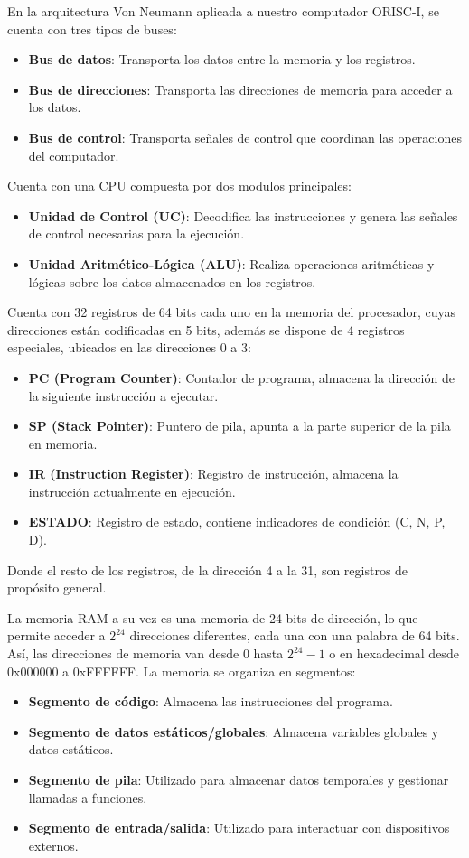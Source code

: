 \documentclass{article}
\begin{document}
En la arquitectura Von Neumann aplicada a nuestro computador ORISC-I, se cuenta con tres tipos de buses:
\begin{itemize}
  \item \textbf{Bus de datos}: Transporta los datos entre la memoria y los registros.
  \item \textbf{Bus de direcciones}: Transporta las direcciones de memoria para acceder a los datos.
  \item \textbf{Bus de control}: Transporta señales de control que coordinan las operaciones del computador.
\end{itemize}

Cuenta con una CPU compuesta por dos modulos principales:
\begin{itemize}
  \item \textbf{Unidad de Control (UC)}: Decodifica las instrucciones y genera las señales de control necesarias para la ejecución.
  \item \textbf{Unidad Aritmético-Lógica (ALU)}: Realiza operaciones aritméticas y lógicas sobre los datos almacenados en los registros.
\end{itemize}

Cuenta con 32 registros de 64 bits cada uno en la memoria del procesador, cuyas direcciones están codificadas en 5 bits, además se dispone de 4 registros especiales, ubicados en las direcciones 0 a 3:
\begin{itemize}
  \item \textbf{PC (Program Counter)}: Contador de programa, almacena la dirección de la siguiente instrucción a ejecutar.
  \item \textbf{SP (Stack Pointer)}: Puntero de pila, apunta a la parte superior de la pila en memoria.
  \item \textbf{IR (Instruction Register)}: Registro de instrucción, almacena la instrucción actualmente en ejecución.
  \item \textbf{ESTADO}: Registro de estado, contiene indicadores de condición (C, N, P, D).
\end{itemize}
Donde el resto de los registros, de la dirección 4 a la 31, son registros de propósito general.

La memoria RAM a su vez es una memoria de 24 bits de dirección, lo que permite acceder a $2^{24}$ direcciones diferentes, cada una con una palabra de 64 bits. Así, las direcciones de memoria van desde 0 hasta $2^{24}-1$ o en hexadecimal desde 0x000000 a 0xFFFFFF. La memoria se organiza en segmentos:
\begin{itemize}
  \item \textbf{Segmento de código}: Almacena las instrucciones del programa.
  \item \textbf{Segmento de datos estáticos/globales}: Almacena variables globales y datos estáticos.
  \item \textbf{Segmento de pila}: Utilizado para almacenar datos temporales y gestionar llamadas a funciones.
  \item \textbf{Segmento de entrada/salida}: Utilizado para interactuar con dispositivos externos.
\end{itemize}
\end{document}
